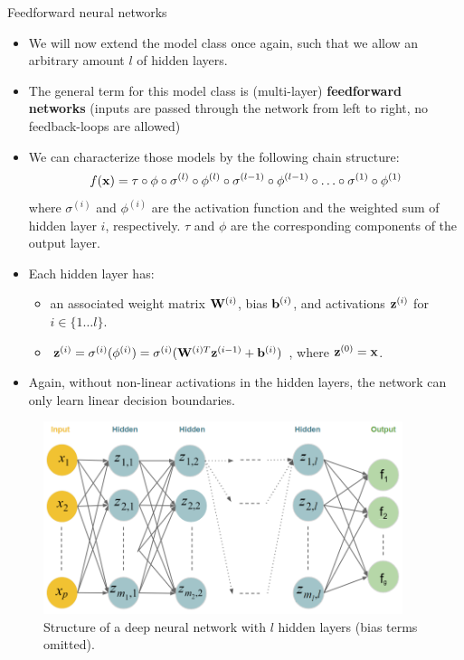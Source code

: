 \begin{vbframe}{Feedforward neural networks}
\begin{itemize}
\vspace{15mm}
\item We will now extend the model class once again, such that we allow an arbitrary amount $l$ of hidden layers.
\vspace{5mm}
\item The general term for this model class is (multi-layer) \textbf{feedforward networks} (inputs are passed through the network from left to right, no feedback-loops are allowed)
\end{itemize}
\framebreak

\begin{itemize}
\item We can characterize those models by the following chain structure: $$f(\mathbf{x}) = \tau \circ \phi \circ \sigma^{(l)} \circ \phi^{(l)} \circ \sigma^{(l-1)} \circ \phi^{(l-1)} \circ \ldots \circ \sigma^{(1)} \circ \phi^{(1)}$$ where $\sigma^{(i)}$ and $\phi^{(i)}$ are the activation function and the weighted sum of hidden layer $i$, respectively. $\tau$ and $\phi$ are the corresponding components of the output layer.
\vspace{5mm}
\item Each hidden layer has: 
\begin{itemize}
\vspace{2mm}
\item an associated weight matrix $\mathbf{W}^{(i)}$, bias $\mathbf{b}^{(i)}$, and activations $\mathbf{z}^{(i)}$ for $i \in \{ 1 \ldots l\}$.
\vspace{2mm}
\item $\mathbf{z}^{(i)} = \sigma^{(i)}(\phi^{(i)}) = \sigma^{(i)}(\mathbf{W}^{(i)T}\mathbf{z}^{(i - 1)} + \mathbf{b}^{(i)})$ , where $\mathbf{z}^{(0)} = \mathbf{x}$.
\end{itemize}
\vspace{5mm}
\item Again, without non-linear activations in the hidden layers, the network can only learn linear decision boundaries.
  \end{itemize}
\framebreak

\lz
\begin{figure}
\centering
\includegraphics[width=10.5cm]{figure/deepneuralnet_new.png}
\caption{Structure of a deep neural network with $l$ hidden layers (bias terms omitted).}
  \end{figure}
\end{vbframe}  

